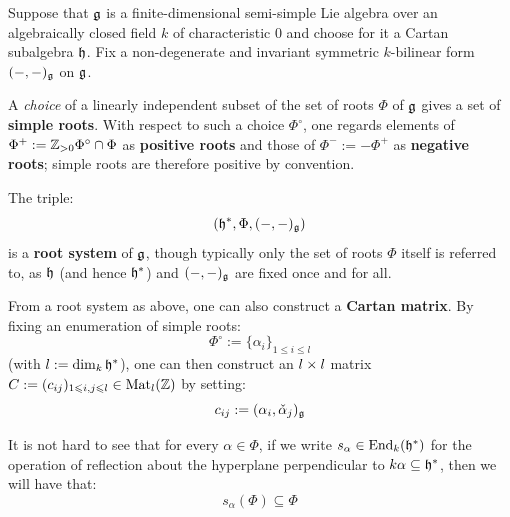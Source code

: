         \begin{definition}
            Suppose that $\mathfrak{g}$ is a finite-dimensional semi-simple Lie algebra over an algebraically closed field $k$ of characteristic $0$ and choose for it a Cartan subalgebra $\mathfrak{h}$. Fix a non-degenerate and invariant symmetric $k$-bilinear form $(-, -)_{\mathfrak{g}}$ on $\mathfrak{g}$.
            
            A \textit{choice} of a linearly independent subset of the set of roots $\Phi$ of $\mathfrak{g}$ gives a set of \textbf{simple roots}. With respect to such a choice $\Phi^{\circ}$, one regards elements of $\Phi^+ := \mathbb{Z}_{> 0} \Phi^{\circ} \cap \Phi$ as \textbf{positive roots} and those of $\Phi^- := -\Phi^+$ as \textbf{negative roots}; simple roots are therefore positive by convention.

            The triple:
                $$(\mathfrak{h}^*, \Phi, (-, -)_{\mathfrak{g}})$$
            is a \textbf{root system} of $\mathfrak{g}$, though typically only the set of roots $\Phi$ itself is referred to, as $\mathfrak{h}$ (and hence $\mathfrak{h}^*$) and $(-, -)_{\mathfrak{g}}$ are fixed once and for all. 

            From a root system as above, one can also construct a \textbf{Cartan matrix}. By fixing an enumeration of simple roots:
                $$\Phi^{\circ} := \{\alpha_i\}_{1 \leq i \leq l}$$
            (with $l := \dim_k \mathfrak{h}^*$), one can then construct an $l \x l$ matrix $C := (c_{ij})_{1 \leqslant i, j \leqslant l} \in \mathrm{Mat}_l(\mathbb{Z})$ by setting:
                $$c_{ij} := (\alpha_i, \check{\alpha}_j)_{\mathfrak{g}}$$
        \end{definition}
        \begin{remark}
            It is not hard to see that for every $\alpha \in \Phi$, if we write $s_{\alpha} \in \mathrm{End}_k(\mathfrak{h}^*)$ for the operation of reflection about the hyperplane perpendicular to $k \alpha \subseteq \mathfrak{h}^*$, then we will have that:
                $$s_{\alpha}(\Phi) \subseteq \Phi$$
        \end{remark}
